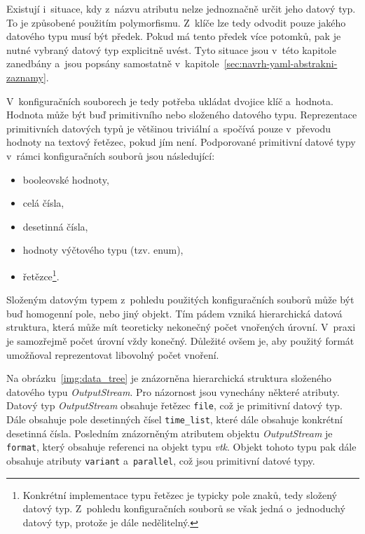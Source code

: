 \documentclass[FM,bw,DP]{tulthesis}
\begin{document}
Existují i~situace, kdy z~názvu atributu nelze jednoznačně určit jeho datový typ. To je způsobené použitím polymorfismu. Z~klíče lze tedy odvodit pouze jakého datového typu musí být předek. Pokud má tento předek více potomků, pak je nutné vybraný datový typ explicitně uvést. Tyto situace jsou v~této kapitole zanedbány a~jsou popsány samostatně v~kapitole~\ref{sec:navrh-yaml-abstrakni-zaznamy}.

V~konfiguračních souborech je tedy potřeba ukládat dvojice klíč a~hodnota. Hodnota může být buď primitivního nebo složeného datového typu. Reprezentace primitivních datových typů je většinou triviální a~spočívá pouze v~převodu hodnoty na textový řetězec, pokud jím není. Podporované primitivní datové typy v~rámci konfiguračních souborů jsou následující:

\vspace{10pt}

\begin{itemize}
	\item booleovské hodnoty,
	\item celá čísla,
	\item desetinná čísla,
	\item hodnoty výčtového typu (tzv. enum),
	\item řetězce\footnote{Konkrétní implementace typu řetězec je typicky pole znaků, tedy složený datový typ. Z~pohledu konfiguračních souborů se však jedná o~jednoduchý datový typ, protože je dále nedělitelný.}.
\end{itemize}

Složeným datovým typem z~pohledu použitých konfiguračních souborů může být buď homogenní pole, nebo jiný objekt. Tím pádem vzniká hierarchická datová struktura, která může mít teoreticky nekonečný počet vnořených úrovní. V~praxi je samozřejmě počet úrovní vždy konečný. Důležité ovšem je, aby použitý formát umožňoval reprezentovat libovolný počet vnoření.

Na obrázku~\ref{img:data_tree} je znázorněna hierarchická struktura složeného datového typu \textit{OutputStream}. Pro názornost jsou vynechány některé atributy. Datový typ \textit{OutputStream} obsahuje řetězec \texttt{file}, což je primitivní datový typ. Dále obsahuje pole desetinných čísel \texttt{time\_list}, které dále obsahuje konkrétní desetinná čísla. Posledním znázorněným atributem objektu \textit{OutputStream} je \texttt{format}, který obsahuje referenci na objekt typu \textit{vtk}. Objekt tohoto typu pak dále obsahuje atributy \texttt{variant} a~\texttt{parallel}, což jsou primitivní datové typy.
\end{document}
